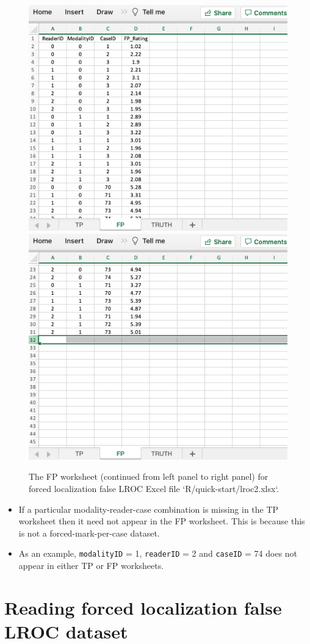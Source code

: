 \documentclass[
]{book}
\providecommand{\tightlist}{%
  \setlength{\itemsep}{0pt}\setlength{\parskip}{0pt}}
\begin{document}
\begin{figure}

{\centering \includegraphics[width=0.5\linewidth]{images/quick-start/lroc2FP1} \includegraphics[width=0.5\linewidth]{images/quick-start/lroc2FP2} 

}

\caption{The FP worksheet (continued from left panel to right panel) for forced localization false LROC Excel file `R/quick-start/lroc2.xlsx`.}\label{fig:quick-start-lroc-fp2}
\end{figure}

\begin{itemize}
\tightlist
\item
  If a particular modality-reader-case combination is missing in the TP worksheet then it need not appear in the FP worksheet. This is because this is not a forced-mark-per-case dataset.
\item
  As an example, \texttt{modalityID} = 1, \texttt{readerID} = 2 and \texttt{caseID} = 74 does not appear in either TP or FP worksheets.
\end{itemize}

\hypertarget{quick-start-lroc-data-2}{%
\section{Reading forced localization false LROC dataset}\label{quick-start-lroc-data-2}}
\end{document}
